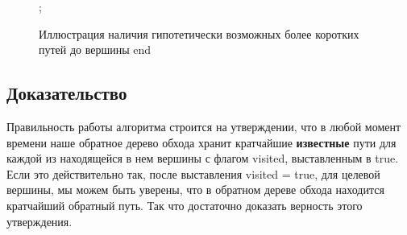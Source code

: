 \documentclass[../../article.tex]{subfiles}
\begin{document}
\begin{figure}
\begin{styledtikz}

        ;
    \end{styledtikz}
    \caption{Иллюстрация наличия гипотетически возможных более коротких путей до вершины {\firacodebold end}}
    \label{fig:dijkstraProve}
\end{figure}

\subsection{Доказательство} \label{dijkstraProve}

Правильность работы алгоритма строится на утверждении, что в любой момент времени наше обратное дерево обхода хранит кратчайшие {\bfseries известные} пути для каждой из находящейся в нем вершины с флагом {\firacodebold visited}, выставленным в {\firacodebold true}. Если это действительно так, после выставления {\firacodebold visited = true}, для целевой вершины, мы можем быть уверены, что в обратном дереве обхода находится кратчайший обратный путь. Так что достаточно доказать верность этого утверждения.
\end{document}
